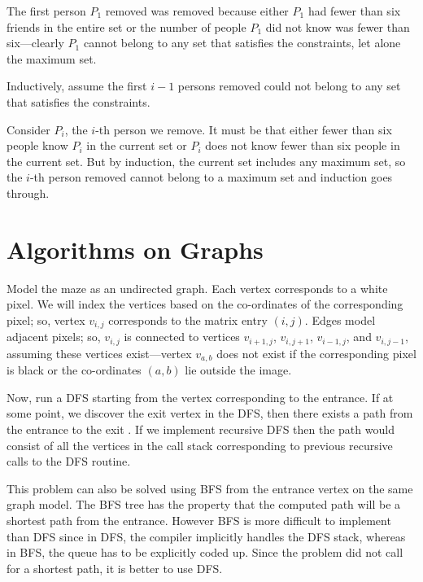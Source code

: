 The first person $P_1$ removed was removed because either $P_1$ had fewer
than six friends in the entire set or the number of people 
$P_1$ did not know was fewer than six---clearly $P_1$ cannot belong to any set that satisfies
the constraints, let alone the maximum set.  

Inductively, assume the first $i-1$ persons removed could not belong to any set that satisfies
the constraints.  

Consider $P_i$, the $i$-th person we remove. It must be that 
either fewer than six people know $P_i$ 
in the current set or $P_i$  does not know fewer than six people in the current set.  
But by induction, the current set includes any maximum set, so 
the $i$-th person removed cannot belong to a maximum set and induction goes through.

\chapter{ Algorithms on Graphs}



Model the maze as an undirected graph.  Each vertex corresponds to a white pixel.
We will index the vertices based on the co-ordinates of the corresponding pixel; so, vertex $v_{i,j}$ corresponds to the matrix entry $(i,j)$.
Edges model adjacent pixels; so, $v_{i,j}$ is connected
to vertices $v_{i+1,j}$, $v_{i,j+1}$, $v_{i-1,j}$, and $v_{i,j-1}$, assuming these
vertices exist---vertex $v_{a,b}$ does not exist if the corresponding pixel is black
or the co-ordinates $(a,b)$ lie outside the image.


Now, run a DFS starting from the vertex corresponding to the entrance. If at some point, we discover the exit vertex in the DFS, then there exists a path from the entrance to the exit .
If we implement recursive DFS then the path would consist of all the vertices in the call stack corresponding to previous recursive calls to the DFS routine.

This problem can also be solved using BFS from the entrance vertex
on the same graph model.  The BFS tree has the property that the
computed path will be a shortest path from the entrance.  However
BFS is more difficult to implement than DFS since in DFS, the compiler implicitly
handles the DFS stack, whereas in BFS, the queue has to be explicitly
coded up.  Since the problem did not call for a shortest path,
it is better to use DFS.

